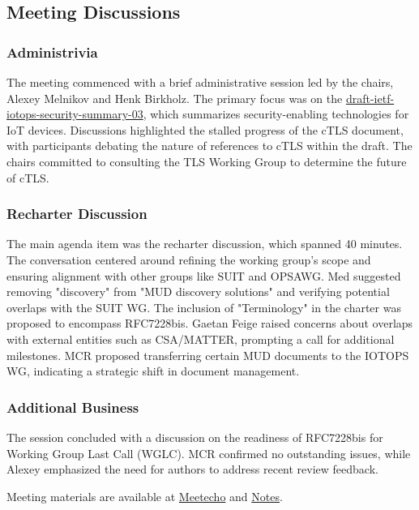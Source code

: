 \documentclass{article}
\begin{document}
\subsection{Meeting Discussions}

\subsubsection{Administrivia}
The meeting commenced with a brief administrative session led by the chairs, Alexey Melnikov and Henk Birkholz. The primary focus was on the \href{https://datatracker.ietf.org/doc/html/draft-ietf-iotops-security-summary-03}{draft-ietf-iotops-security-summary-03}, which summarizes security-enabling technologies for IoT devices. Discussions highlighted the stalled progress of the cTLS document, with participants debating the nature of references to cTLS within the draft. The chairs committed to consulting the TLS Working Group to determine the future of cTLS.

\subsubsection{Recharter Discussion}
The main agenda item was the recharter discussion, which spanned 40 minutes. The conversation centered around refining the working group's scope and ensuring alignment with other groups like SUIT and OPSAWG. Med suggested removing "discovery" from "MUD discovery solutions" and verifying potential overlaps with the SUIT WG. The inclusion of "Terminology" in the charter was proposed to encompass RFC7228bis. Gaetan Feige raised concerns about overlaps with external entities such as CSA/MATTER, prompting a call for additional milestones. MCR proposed transferring certain MUD documents to the IOTOPS WG, indicating a strategic shift in document management.

\subsubsection{Additional Business}
The session concluded with a discussion on the readiness of RFC7228bis for Working Group Last Call (WGLC). MCR confirmed no outstanding issues, while Alexey emphasized the need for authors to address recent review feedback.

Meeting materials are available at \href{https://meetings.conf.meetecho.com/ietf122/?group=iotops&short=&item=1}{Meetecho} and \href{https://notes.ietf.org/notes-ietf-122-iotops}{Notes}.
\end{document}
